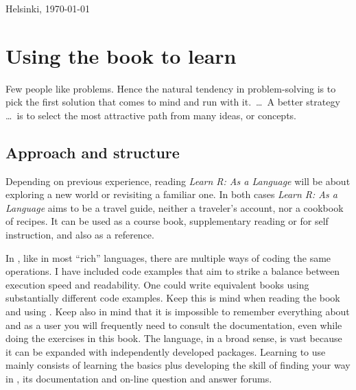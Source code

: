 \documentclass[krantz2]{krantz}\usepackage{knitr}
\begin{document}
Helsinki, \today

\chapter*{Using the book to learn \Rlang}

\begin{VF}
Few people like problems. Hence the natural tendency in problem-solving is to pick the first solution that comes to mind and run with it.\ \ldots\ A better strategy \ldots\ is to select the most attractive path from many ideas, or concepts.

\nocite{Adams1987}
\end{VF}

\section*{Approach and structure}

Depending on previous experience, reading \emph{Learn R: As a Language} will be about exploring a new world or revisiting a familiar one. In both cases \emph{Learn R: As a Language} aims to be a travel guide, neither a traveler's account, nor a cookbook of \Rlang recipes. It can be used as a course book, supplementary reading or for self instruction, and also as a reference.

In \Rlang, like in most ``rich'' languages, there are multiple ways of coding the same operations. I have included code examples that aim to strike a balance between execution speed and readability. One could write equivalent \Rlang books using substantially different code examples. Keep this is mind when reading the book and using \Rlang. Keep also in mind that it is impossible to remember everything about \Rlang and as a user you will frequently need to consult the documentation, even while doing the exercises in this book. The \Rlang language, in a broad sense, is vast because it can be expanded with independently developed packages. Learning to use \Rlang mainly consists of learning the basics plus developing the skill of finding your way in \Rlang, its documentation and on-line question and answer forums.
\end{document}
